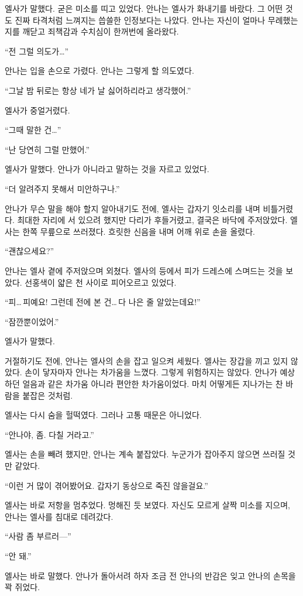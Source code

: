 엘사가 말했다. 굳은 미소를 띠고 있었다. 안나는 엘사가 화내기를 바랐다. 그 어떤 것도 진짜 타격처럼 느껴지는 씁쓸한 인정보다는 나았다. 안나는 자신이 얼마나 무례했는지를 깨닫고 죄책감과 수치심이 한꺼번에 올라왔다.

``전 그럴 의도가\ldots''

안나는 입을 손으로 가렸다. 안나는 그렇게 할 의도였다.

``그날 밤 뒤로는 항상 네가 날 싫어하리라고 생각했어.''

엘사가 중얼거렸다.

``그때 말한 건\ldots''

``난 당연히 그럴 만했어.''

엘사가 말했다. 안나가 아니라고 말하는 것을 자르고 있었다.

``더 알려주지 못해서 미안하구나.''

안나가 무슨 말을 해야 할지 알아내기도 전에, 엘사는 갑자기 잇소리를 내며 비틀거렸다. 최대한 자리에 서 있으려 했지만 다리가 후들거렸고, 결국은 바닥에 주저앉았다. 엘사는 한쪽 무릎으로 쓰러졌다. 흐릿한 신음을 내며 어깨 위로 손을 올렸다.

``괜찮으세요?''

안나는 엘사 곁에 주저앉으며 외쳤다. 엘사의 등에서 피가 드레스에 스며드는 것을 보았다. 선홍색이 얇은 천 사이로 피어오르고 있었다.

``피\ldots\,피예요! 그런데 전에 본 건\ldots\,다 나은 줄 알았는데요!''

``잠깐뿐이었어.''

엘사가 말했다.

거절하기도 전에, 안나는 엘사의 손을 잡고 일으켜 세웠다. 엘사는 장갑을 끼고 있지 않았다. 손이 닿자마자 안나는 차가움을 느꼈다. 그렇게 위험하지는 않았다. 안나가 예상하던 얼음과 같은 차가움 아니라 편안한 차가움이었다. 마치 어떻게든 지나가는 찬 바람을 붙잡은 것처럼.

엘사는 다시 숨을 헐떡였다. 그러나 고통 때문은 아니었다.

``안나야, 좀. 다칠 거라고.''

엘사는 손을 빼려 했지만, 안나는 계속 붙잡았다. 누군가가 잡아주지 않으면 쓰러질 것만 같았다.

``이런 거 많이 겪어봤어요. 갑자기 동상으로 죽진 않을걸요.''

엘사는 바로 저항을 멈추었다. 멍해진 듯 보였다. 자신도 모르게 살짝 미소를 지으며, 안나는 엘사를 침대로 데려갔다.

``사람 좀 부르러—''

``안 돼.''

엘사는 바로 말했다. 안나가 돌아서려 하자 조금 전 안나의 반감은 잊고 안나의 손목을 꽉 쥐었다.

